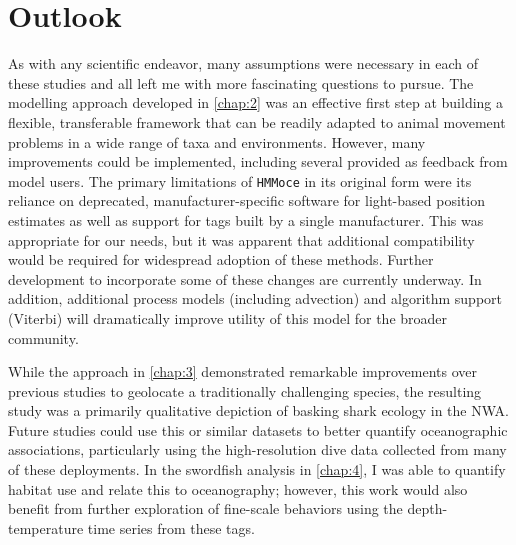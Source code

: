 \section{Outlook}
As with any scientific endeavor, many assumptions were necessary in each of these studies and all left me with more fascinating questions to pursue. The modelling approach developed in \cref{chap:2} was an effective first step at building a flexible, transferable framework that can be readily adapted to animal movement problems in a wide range of taxa and environments. However, many improvements could be implemented, including several provided as feedback from model users. The primary limitations of \texttt{HMMoce} in its original form were its reliance on deprecated, manufacturer-specific software for light-based position estimates as well as support for tags built by a single manufacturer. This was appropriate for our needs, but it was apparent that additional compatibility would be required for widespread adoption of these methods. Further development to incorporate some of these changes are currently underway. In addition, additional process models (\eg including advection) and algorithm support (\eg Viterbi) will dramatically improve utility of this model for the broader community.

While the approach in \cref{chap:3} demonstrated remarkable improvements over previous studies to geolocate a traditionally challenging species, the resulting study was a primarily qualitative depiction of basking shark ecology in the NWA. Future studies could use this or similar datasets to better quantify oceanographic associations, particularly using the high-resolution dive data collected from many of these deployments. In the swordfish analysis in \cref{chap:4}, I was able to quantify habitat use and relate this to oceanography; however, this work would also benefit from further exploration of fine-scale behaviors using the depth-temperature time series from these tags.

